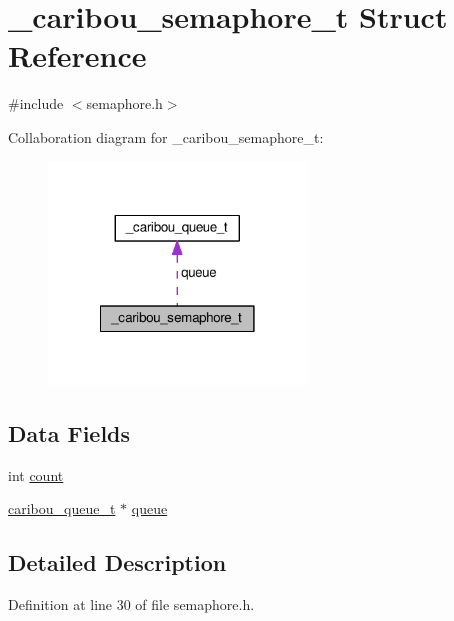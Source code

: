 \hypertarget{struct__caribou__semaphore__t}{\section{\-\_\-caribou\-\_\-semaphore\-\_\-t Struct Reference}
\label{struct__caribou__semaphore__t}
}


{\ttfamily \#include $<$semaphore.\-h$>$}



Collaboration diagram for \-\_\-caribou\-\_\-semaphore\-\_\-t\-:
\nopagebreak
\begin{figure}[H]
\begin{center}
\leavevmode
\includegraphics[width=194pt]{struct__caribou__semaphore__t__coll__graph}
\end{center}
\end{figure}
\subsection*{Data Fields}
\begin{DoxyCompactItemize}
\item 
int \hyperlink{struct__caribou__semaphore__t_ac20e6280acd9c0aadb09d81b55c6eb22}{count}
\item 
\hyperlink{queue_8h_a4f0b560adcb67d9f889225d932d36070}{caribou\-\_\-queue\-\_\-t} $\ast$ \hyperlink{struct__caribou__semaphore__t_a465e6ba07fd7c5130f9f3e47b4761729}{queue}
\end{DoxyCompactItemize}


\subsection{Detailed Description}


Definition at line 30 of file semaphore.\-h.



